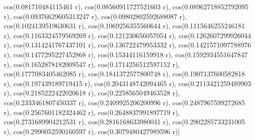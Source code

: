 \documentclass[a4paper,10pt]{article}
\begin{document}
\begin{eulernotebook}
\begin{euleroutput}
  cos(0.081710484115461 r), cos(0.08560911727521603 r), 
  cos(0.08962718852792095 r), cos(0.09376629605313247 r), 
  cos(0.09802802592688087 r), cos(0.1024139519630631 r), 
  cos(0.1069256355560644 r), cos(0.1115646255246181 r), 
  cos(0.1163324579569269 r), cos(0.121230656057054 r), 
  cos(0.1262607299926044 r), cos(0.1314241767437101 r), 
  cos(0.136722479953332 r), cos(0.1421571097788976 r), 
  cos(0.1477295227452868 r), cos(0.15344116159918 r), 
  cos(0.1592934551647847 r), cos(0.1652878182009547 r), 
  cos(0.1714256512597152 r), cos(0.1777083405462085 r), 
  cos(0.1841372577800748 r), cos(0.1907137600582818 r), 
  cos(0.197439189719415 r), cos(0.2043148742094465 r), 
  cos(0.2113421259489903 r), cos(0.2185222422020618 r), 
  cos(0.2258565049463528 r), cos(0.2333461807450337 r), 
  cos(0.2409925206200996 r), cos(0.2487967599272685 r), 
  cos(0.2567601182324462 r), cos(0.2648837991897719 r), 
  cos(0.2731689904212531 r), cos(0.2816168633980041 r), 
  cos(0.2902285733231005 r), cos(0.2990052590160597 r), 
  cos(0.3079480427989596 r)]
  
\end{euleroutput}
\begin{euleroutput}
  

\end{euleroutput}
\end{eulernotebook}
\end{document}
